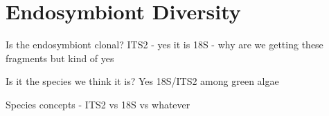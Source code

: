 % 
\graphicspath{{chapters/3.Chapter_1/figures}}

\chapter{Endosymbiont Diversity}

Is the endosymbiont clonal?
ITS2 - yes it is
18S - why are we getting these fragments but kind of yes

Is it the species we think it is?
Yes 18S/ITS2 among green algae

Species concepts  - ITS2 vs 18S vs whatever \citep{Boenigk2012}
